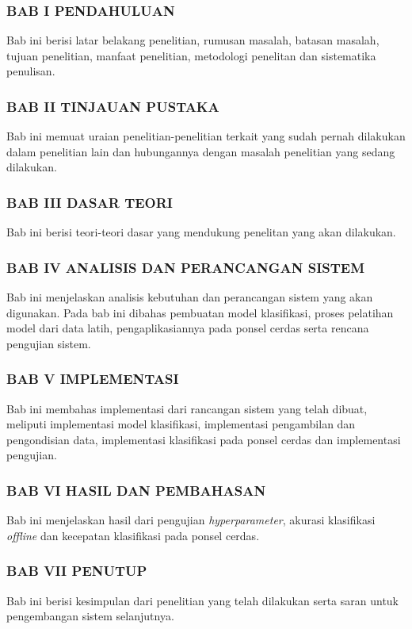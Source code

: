 \subsubsection{BAB I PENDAHULUAN}
Bab ini berisi latar belakang penelitian, rumusan masalah, batasan masalah, tujuan penelitian, manfaat penelitian, metodologi penelitan dan sistematika penulisan.

\subsubsection{BAB II TINJAUAN PUSTAKA}
Bab ini memuat uraian penelitian-penelitian terkait yang sudah pernah dilakukan dalam penelitian lain dan hubungannya dengan masalah penelitian yang sedang dilakukan.

\subsubsection{BAB III DASAR TEORI}
Bab ini berisi teori-teori dasar yang mendukung penelitan yang akan dilakukan.

\subsubsection{BAB IV ANALISIS DAN PERANCANGAN SISTEM}
Bab ini menjelaskan analisis kebutuhan dan perancangan sistem yang akan digunakan. Pada bab ini dibahas pembuatan model klasifikasi, proses pelatihan model dari data latih, pengaplikasiannya pada ponsel cerdas serta rencana pengujian sistem.

\subsubsection{BAB V IMPLEMENTASI}
Bab ini membahas implementasi dari rancangan sistem yang telah dibuat, meliputi implementasi model klasifikasi, implementasi pengambilan dan pengondisian data, implementasi klasifikasi pada ponsel cerdas dan implementasi pengujian.

\subsubsection{BAB VI HASIL DAN PEMBAHASAN}
Bab ini menjelaskan hasil dari pengujian \textit{hyperparameter}, akurasi klasifikasi \textit{offline} dan kecepatan klasifikasi pada ponsel cerdas.

\subsubsection{BAB VII PENUTUP}
Bab ini berisi kesimpulan dari penelitian yang telah dilakukan serta saran untuk pengembangan sistem selanjutnya.
